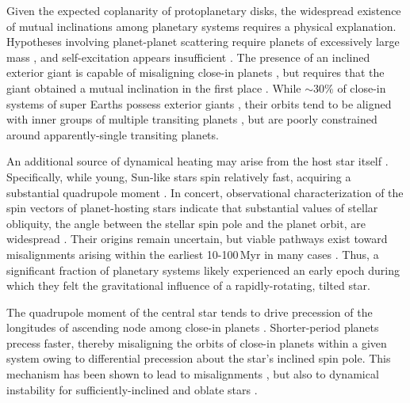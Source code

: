 \documentclass[twocolumn]{aastex63}
\begin{document}
Given the expected coplanarity of protoplanetary disks, the widespread existence of mutual inclinations among planetary systems requires a physical explanation. Hypotheses involving planet-planet scattering require planets of excessively large mass \citep{johansen2012can}, and self-excitation appears insufficient \citep{becker2016oscillations}. The presence of an inclined exterior giant is capable of misaligning close-in planets \citep{hansen2017perturbation,becker2017effects,2017AJ....153...42L}, but requires that the giant obtained a mutual inclination in the first place \citep{pu2020strong}. While $\sim 30\%$ of close-in systems of super Earths possess exterior giants \citep{bryan2019excess}, their orbits tend to be aligned with inner groups of multiple transiting planets
\citep{masuda2020mutual}, but are poorly constrained around %
apparently-single transiting planets. 

An additional source of dynamical heating may arise from the host star itself \citep{spalding2016spin}. Specifically, while young, Sun-like stars spin relatively fast, acquiring a substantial quadrupole moment \citep{kraft1967studies,Ward1976secular}. In concert, observational characterization of the spin vectors of planet-hosting stars indicate that substantial values of stellar obliquity, the angle between the stellar spin pole and the planet orbit, are widespread \citep{winn2010hot,albrecht2012obliquities,winn2015occurrence,winn2017constraints}. Their origins remain uncertain, but viable pathways exist toward misalignments arising within the earliest 10-100\,Myr in many cases \citep{batygin2012primordial,spalding2014early,davies2019star}. Thus, a significant fraction of planetary systems likely experienced an early epoch during which they felt the gravitational influence of a rapidly-rotating, tilted star. 

The quadrupole moment of the central star tends to drive precession of the longitudes of ascending node among close-in planets \citep{murray1999solar}. Shorter-period planets precess faster, thereby misaligning the orbits of close-in planets within a given system owing to differential precession about the star's inclined spin pole. This mechanism has been shown to lead to misalignments \citep{spalding2016spin}, but also to dynamical instability for sufficiently-inclined and oblate stars \citep{spalding2018resilience}. 
\end{document}
